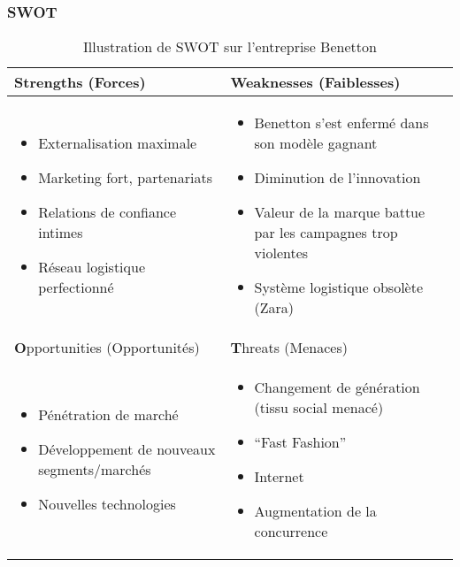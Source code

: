 	\subsubsection{SWOT}
		\begin{table}[!ht]
			\begin{center}
				\begin{tabular}{|>{\centering\arraybackslash}P{7.5cm}||>{\centering\arraybackslash}P{7.5cm}|}
				 \hline
				   \textbf{S}trengths (Forces) &  \textbf{W}eaknesses (Faiblesses) \\ \hline
				  \begin{itemize} 
					\item Externalisation maximale
					\item Marketing fort, partenariats
					\item Relations de confiance intimes
					\item Réseau logistique perfectionné
				  \end{itemize}
				  & 
				  \begin{itemize} 
					\item Benetton s'est enfermé dans son modèle gagnant
					\item Diminution de l'innovation
					\item Valeur de la marque battue par les campagnes trop violentes
					\item Système logistique obsolète (Zara)
				  \end{itemize}
				  \\  \hline
				   \textbf{O}pportunities (Opportunités) &  \textbf{T}hreats (Menaces) \\ \hline
				  \begin{itemize}
					\item Pénétration de marché
					\item Développement de nouveaux segments/marchés
					\item Nouvelles technologies
				  \end{itemize}
				  &
				  \begin{itemize}
				   \item Changement de génération (tissu social menacé)
				   \item \enquote{Fast Fashion}
				   \item Internet
				   \item Augmentation de la concurrence
				  \end{itemize}
				  \\ \hline
				  
				\end{tabular}
				\caption{Illustration de SWOT sur l'entreprise Benetton}
			\end{center}
		\end{table}
